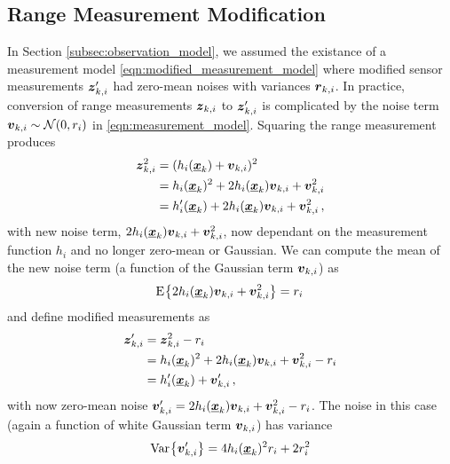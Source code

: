 \documentclass[10pt,journal,compsoc]{IEEEtran}
\theoremstyle{definition}
\theoremstyle{definition}
\theoremstyle{remark}
\begin{document}
\subsection{Range Measurement Modification} \label{subsec:range_measurement_mod}
In Section \ref{subsec:observation_model}, we assumed the existance of a measurement model \eqref{eqn:modified_measurement_model} where modified sensor measurements ${\boldsymbol{z}}'_{k,i}$ had zero-mean noises with variances ${\boldsymbol{r}}_{k,i}$. In practice, conversion of range measurements ${\boldsymbol{z}}_{k,i}$ to ${\boldsymbol{z}}'_{k,i}$ is complicated by the noise term ${\boldsymbol{v}}_{k,i} \sim \mathcal{N}(0, r_i)$ in \eqref{eqn:measurement_model}. Squaring the range measurement produces
\begin{equation}
    \begin{split}
        {\boldsymbol{z}}_{k,i}^2 &= (h_i({\boldsymbol{\underline{x}}}_k) + {\boldsymbol{v}}_{k,i})^2 \\
        &= h_i({\boldsymbol{\underline{x}}}_k)^2 + 2h_i({\boldsymbol{\underline{x}}}_k){\boldsymbol{v}}_{k,i} + {\boldsymbol{v}}_{k,i}^2 \\
        &= h'_i({\boldsymbol{\underline{x}}}_k) + 2h_i({\boldsymbol{\underline{x}}}_k){\boldsymbol{v}}_{k,i} + {\boldsymbol{v}}_{k,i}^2\,,
    \end{split}
\end{equation}
with new noise term, $2h_i({\boldsymbol{\underline{x}}}_k){\boldsymbol{v}}_{k,i} + {\boldsymbol{v}}_{k,i}^2$, now dependant on the measurement function $h_i$ and no longer zero-mean or Gaussian. We can compute the mean of the new noise term (a function of the Gaussian term ${\boldsymbol{v}}_{k,i}$) as
\begin{equation}
    \E{2h_i(\rvec{x}_k)\rv{v}_{k,i} + \rv{v}_{k,i}^2} = r_i\, \label{eqn:modified_noise_mean}
\end{equation}
and define modified measurements as
\begin{equation} \label{eqn:modified_measurement}
    \begin{split}
        \rv{z}'_{k,i} &= \rv{z}_{k,i}^2 - r_i \\
        &= h_i(\rvec{x}_k)^2 + 2h_i(\rvec{x}_k)\rv{v}_{k,i} + \rv{v}_{k,i}^2 - r_i \\
        &= h'_i(\rvec{x}_k) + \rv{v}'_{k,i}\,,
    \end{split}
\end{equation}
with now zero-mean noise ${\boldsymbol{v}}'_{k,i} = 2h_i({\boldsymbol{\underline{x}}}_k){\boldsymbol{v}}_{k,i} + {\boldsymbol{v}}_{k,i}^2 - r_i$. The noise in this case (again a function of white Gaussian term ${\boldsymbol{v}}_{k,i}$) has variance 
\begin{equation}
    \Var{\rv{v}'_{k,i}} = 4h_i(\rvec{x}_k)^2r_i + 2r_i^2
\end{equation}
\end{document}
